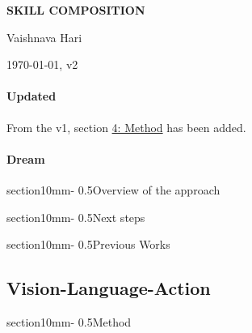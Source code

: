 \documentclass[11pt,a4paper]{article}
\makeatletter
\renewcommand{\section}{\@startsection%
{section}{1}{0mm}{-\baselineskip}%
{0.5\baselineskip}{\normalfont\Large\bfseries}}%
\makeatother
\begin{document}
\pagestyle{plain}



\begin{center} 
\bfseries\uppercase{Skill composition}
\end{center}
\vspace{-0.3cm}
\centerline{{Vaishnava Hari}}
\centerline{\today, v2}


\vspace{0.5cm}
\begin{tcolorbox}[
    colback=blue!5!white,    %
    colframe=blue!80!black,  %
    left=2mm,                %
    enhanced,
    borderline west={2pt}{0pt}{blue!80!black}, %
    boxrule=0pt,             %
    sharp corners
]
\paragraph{Updated}
From the v1, section \underline{4: Method} has been added.
\end{tcolorbox}

\paragraph{Dream}
    

\section{Overview of the approach}
    

\section{Next steps}
    

\section{Previous Works}
    \subsection{Vision-Language-Action}
        

\section{Method}
    


\end{document}

